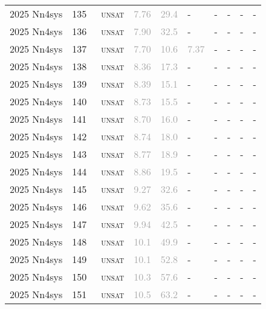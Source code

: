 \begin{center}
{\begin{longtable}{@{}llllllllll@{}}
2025 Nn4sys & 135 & ~\textsc{unsat} & \textcolor{darkgray}{7.76} & \textcolor{darkgray}{29.4} & - & - & - & - & - \\
2025 Nn4sys & 136 & ~\textsc{unsat} & \textcolor{darkgray}{7.90} & \textcolor{darkgray}{32.5} & - & - & - & - & - \\
2025 Nn4sys & 137 & ~\textsc{unsat} & \textcolor{darkgray}{7.70} & \textcolor{darkgray}{10.6} & \textcolor{darkgray}{7.37} & - & - & - & - \\
2025 Nn4sys & 138 & ~\textsc{unsat} & \textcolor{darkgray}{8.36} & \textcolor{darkgray}{17.3} & - & - & - & - & - \\
2025 Nn4sys & 139 & ~\textsc{unsat} & \textcolor{darkgray}{8.39} & \textcolor{darkgray}{15.1} & - & - & - & - & - \\
2025 Nn4sys & 140 & ~\textsc{unsat} & \textcolor{darkgray}{8.73} & \textcolor{darkgray}{15.5} & - & - & - & - & - \\
2025 Nn4sys & 141 & ~\textsc{unsat} & \textcolor{darkgray}{8.70} & \textcolor{darkgray}{16.0} & - & - & - & - & - \\
2025 Nn4sys & 142 & ~\textsc{unsat} & \textcolor{darkgray}{8.74} & \textcolor{darkgray}{18.0} & - & - & - & - & - \\
2025 Nn4sys & 143 & ~\textsc{unsat} & \textcolor{darkgray}{8.77} & \textcolor{darkgray}{18.9} & - & - & - & - & - \\
2025 Nn4sys & 144 & ~\textsc{unsat} & \textcolor{darkgray}{8.86} & \textcolor{darkgray}{19.5} & - & - & - & - & - \\
2025 Nn4sys & 145 & ~\textsc{unsat} & \textcolor{darkgray}{9.27} & \textcolor{darkgray}{32.6} & - & - & - & - & - \\
2025 Nn4sys & 146 & ~\textsc{unsat} & \textcolor{darkgray}{9.62} & \textcolor{darkgray}{35.6} & - & - & - & - & - \\
2025 Nn4sys & 147 & ~\textsc{unsat} & \textcolor{darkgray}{9.94} & \textcolor{darkgray}{42.5} & - & - & - & - & - \\
2025 Nn4sys & 148 & ~\textsc{unsat} & \textcolor{darkgray}{10.1} & \textcolor{darkgray}{49.9} & - & - & - & - & - \\
2025 Nn4sys & 149 & ~\textsc{unsat} & \textcolor{darkgray}{10.1} & \textcolor{darkgray}{52.8} & - & - & - & - & - \\
2025 Nn4sys & 150 & ~\textsc{unsat} & \textcolor{darkgray}{10.3} & \textcolor{darkgray}{57.6} & - & - & - & - & - \\
2025 Nn4sys & 151 & ~\textsc{unsat} & \textcolor{darkgray}{10.5} & \textcolor{darkgray}{63.2} & - & - & - & - & - \\

\end{longtable}}
\end{center}

